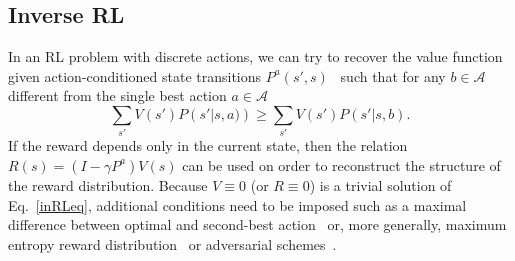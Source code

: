 \documentclass{article}
\begin{document}
%

\subsection{Inverse RL\label{invRL}}

In an RL problem with discrete actions, we can try to recover 
the value function given action-conditioned state transitions $P^a(s',s)$~\cite{ng2000algorithms}
such that for any $b \in \mathcal{A}$ different from the single best action $a \in \mathcal{A}$ 
\begin{equation}
	\sum_{s'} V\left(s'\right) P\left(s'|s,a) \right)
	\ge\sum_{s'} V\left(s'\right) P\left(s'|s,b\right).
	\label{inRLeq}
\end{equation}
If the reward depends only in the current state,
then the relation $R(s)=\left(I-\gamma P^{a}\right)V(s)$ can be used on order to reconstruct 
the structure of the reward distribution. Because $V\equiv 0$ (or $R\equiv 0$) is a trivial 
solution of Eq.~\ref{inRLeq},
additional conditions need to be imposed such as a maximal difference between optimal and second-best action~\cite{ng2000algorithms}  or, more generally, maximum entropy reward 
distribution~\cite{ziebart2008maximum} or adversarial schemes~\cite{pfau2016connecting}. 
\end{document}
